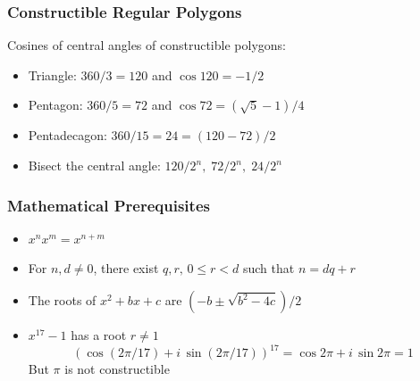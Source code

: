 \documentclass{beamer}
\begin{document}

\begin{frame}
\frametitle{Constructible Regular Polygons}
\begin{center}
\end{center}

\pause

Cosines of central angles of constructible polygons:
\begin{itemize}
\item Triangle: $360/3=120$ and $\cos 120=-1/2$
\item Pentagon: $360/5=72$ and $\cos 72=(\sqrt{5}-1)/4$
\item Pentadecagon: $360/15=24=(120-72)/2$
\item Bisect the central angle: $120/2^n,\; 72/2^n,\; 24/2^n$
\end{itemize}

\end{frame}


\begin{frame}
\frametitle{Mathematical Prerequisites}

\pause

\begin{itemize}
\item $x^nx^m=x^{n+m}$
\pause

\medskip

\item For $n,d\neq 0$, there exist $q,r,\,0\leq r < d$ such that $n=dq+r$
\pause
\medskip
\item The roots of $x^2+bx+c$ are $(-b\pm\sqrt{b^2-4c})/2$

\medskip
\pause
\item $x^{17}-1$ has a root $r\neq 1$
\[
(\cos (2\pi/17) + i\,\sin  (2\pi/17))^{17} = \cos 2\pi + i\,\sin 2\pi = 1
\]
But $\pi$ is not constructible
\end{itemize}
\end{frame}
\end{document}
